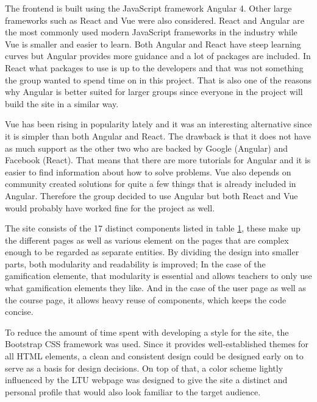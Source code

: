 The frontend is built using the JavaScript framework Angular 4. Other large frameworks such as React and Vue were also considered. React and Angular are the most commonly used modern JavaScript frameworks in the industry while Vue is smaller and easier to learn. Both Angular and React have steep learning curves but Angular provides more guidance and a lot of packages are included. In React what packages to use is up to the developers and that was not something the group wanted to spend time on in this project. That is also one of the reasons why Angular is better suited for larger groups since everyone in the project will build the site in a similar way. 

Vue has been rising in popularity lately and it was an interesting alternative since it is simpler than both Angular and React. The drawback is that it does not have as much support as the other two who are backed by Google (Angular) and Facebook (React). That means that there are more tutorials for Angular and it is easier to find information about how to solve problems. Vue also depends on community created solutions for quite a few things that is already included in Angular. Therefore the group decided to use Angular but both React and Vue would probably have worked fine for the project as well.

The site consists of the 17 distinct components listed in table \ref{tab:components}, these make up the different pages as well as various element on the pages that are complex enough to be regarded as separate entities. By dividing the design into smaller parts, both modularity and readability is improved; In the case of the gamification elemente, that modularity is essential and allows teachers to only use what gamification elements they like. And in the case of the user page as well as the course page, it allows heavy reuse of components, which keeps the code concise.

To reduce the amount of time spent with developing a style for the site, the Bootstrap CSS framework was used. Since it provides well-established themes for all HTML elements, a clean and consistent design could be designed early on to serve as a basis for design decisions. On top of that, a color scheme lightly influenced by the LTU webpage was designed to give the site a distinct and personal profile that would also look familiar to the target audience.

\begin{figure}[hb]
    \centering
    \begin{tabular}{r|l}
        
    \end{tabular}
    \label{tab:components}
\end{figure}

